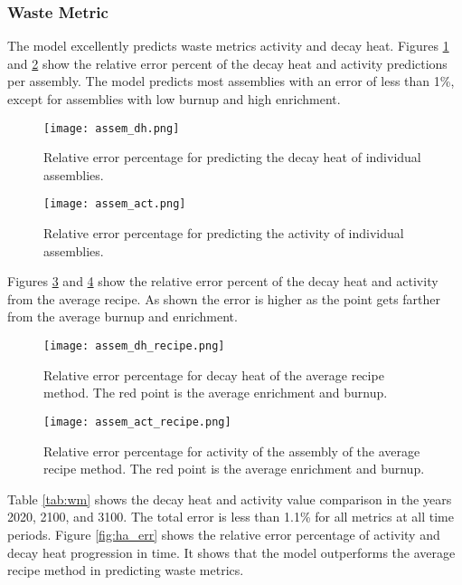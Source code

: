 \subsubsection{Waste Metric}
The model excellently predicts waste metrics activity
and decay heat. Figures \ref{fig:assem_dh} and \ref{fig:assem_act}
show the relative error percent of the decay heat and activity
predictions per assembly. The model predicts most assemblies
with an error of less than 1\%, except for assemblies with low
burnup and high enrichment.


\begin{figure}
    \centering
    \texttt{[image: assem\_dh.png]}
    \caption{Relative error percentage for predicting the decay
             heat of individual assemblies.}
    \label{fig:assem_dh}
\end{figure}


\begin{figure}
    \centering
    \texttt{[image: assem\_act.png]}
    \caption{Relative error percentage for predicting the
             activity of individual assemblies.}
    \label{fig:assem_act}
\end{figure}


Figures \ref{fig:assem_dh_recipe} and
\ref{fig:assem_act_recipe} show the relative error percent
of the decay heat and activity from the average recipe.
As shown the error is higher as the point gets farther from
the average burnup and enrichment.



\begin{figure}
    \centering
    \texttt{[image: assem\_dh\_recipe.png]}
    \caption{Relative error percentage for decay heat
             of the average recipe
             method. The red point is the average enrichment and
             burnup.}
    \label{fig:assem_dh_recipe}
\end{figure}

\begin{figure}
    \centering
    \texttt{[image: assem\_act\_recipe.png]}
    \caption{Relative error percentage for activity
             of the assembly of the average recipe
             method. The red point is the average enrichment and
             burnup.}
    \label{fig:assem_act_recipe}
\end{figure}

\FloatBarrier


Table \ref{tab:wm} shows the decay heat and activity value
comparison in the years 2020, 2100, and 3100. The total
error is less than 1.1\% for all metrics at all time periods.
Figure \ref{fig:ha_err} shows the relative error percentage
of activity and decay heat progression in time. It shows
that the model outperforms the average recipe method
in predicting waste metrics.


